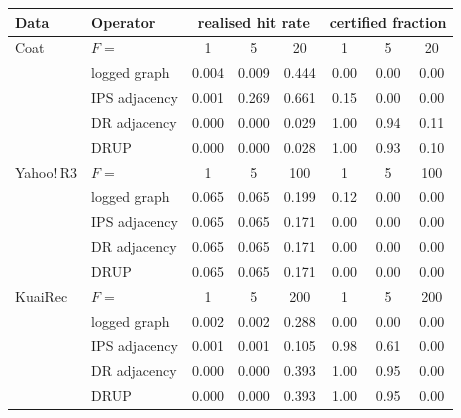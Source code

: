 \begin{tabular}{llcccccc}
\toprule
Data & Operator & \multicolumn{3}{c}{realised hit rate} & \multicolumn{3}{c}{certified fraction}\\
\midrule
Coat & $F=$ & 1 & 5 & 20 & 1 & 5 & 20\\
 & logged graph & 0.004 & 0.009 & 0.444 & 0.00 & 0.00 & 0.00\\
 & IPS adjacency & 0.001 & 0.269 & 0.661 & 0.15 & 0.00 & 0.00\\
 & DR adjacency & 0.000 & 0.000 & 0.029 & 1.00 & 0.94 & 0.11\\
 & DRUP & 0.000 & 0.000 & 0.028 & 1.00 & 0.93 & 0.10\\
\midrule
Yahoo!\,R3 & $F=$ & 1 & 5 & 100 & 1 & 5 & 100\\
 & logged graph & 0.065 & 0.065 & 0.199 & 0.12 & 0.00 & 0.00\\
 & IPS adjacency & 0.065 & 0.065 & 0.171 & 0.00 & 0.00 & 0.00\\
 & DR adjacency & 0.065 & 0.065 & 0.171 & 0.00 & 0.00 & 0.00\\
 & DRUP & 0.065 & 0.065 & 0.171 & 0.00 & 0.00 & 0.00\\
\midrule
KuaiRec & $F=$ & 1 & 5 & 200 & 1 & 5 & 200\\
 & logged graph & 0.002 & 0.002 & 0.288 & 0.00 & 0.00 & 0.00\\
 & IPS adjacency & 0.001 & 0.001 & 0.105 & 0.98 & 0.61 & 0.00\\
 & DR adjacency & 0.000 & 0.000 & 0.393 & 1.00 & 0.95 & 0.00\\
 & DRUP & 0.000 & 0.000 & 0.393 & 1.00 & 0.95 & 0.00\\
\bottomrule
\end{tabular}
